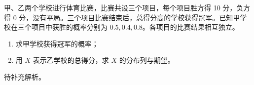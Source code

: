 \begin{prob}[source={2022全国甲理19}, topic={独立事件与分布列}, score=12]
甲、乙两个学校进行体育比赛，比赛共设三个项目，每个项目胜方得 10 分，负方得 0 分，没有平局。三个项目比赛结束后，总得分高的学校获得冠军。已知甲学校在三个项目中获胜的概率分别为 $0.5, 0.4, 0.8$。各项目的比赛结果相互独立。
\begin{enumerate}
	\item[(1)] 求甲学校获得冠军的概率；
	\item[(2)] 用 $X$ 表示乙学校的总得分，求 $X$ 的分布列与期望。
\end{enumerate}
\end{prob}
\begin{prob-sol}
待补充解析。
\end{prob-sol}
